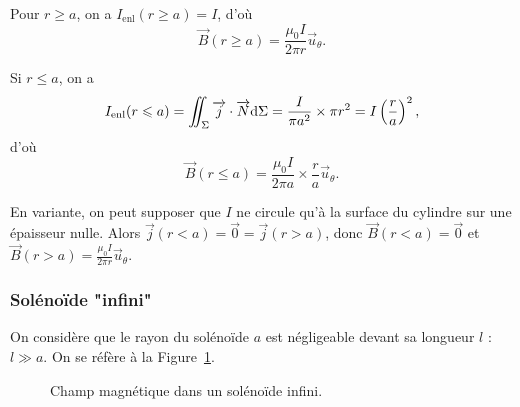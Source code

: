             Pour $r\geqslant a$, on a $I_{\text{enl}}(r\geqslant a)=I$, d'où 
            \begin{equation*}
                \boxed{
                    \vec{B}(r\geqslant a)=\frac{\mu_0 I}{2\pi r}\vec{u}_{\theta}.
                }
            \end{equation*}

            Si $r\leqslant a$, on a 
            \begin{equation*}
                I_{\text{enl}}(r\leqslant a)=\iint_{\Sigma}\protect\overrightarrow{{j}}\cdot\protect\overrightarrow{{N}}\mathrm{d}\Sigma=\frac{I}{\pi a^{2}}\times\pi r^{2}=I\left(\frac{r}{a}\right)^{2},
            \end{equation*}
            d'où
            \begin{equation*}
                \boxed{
                \vec{B}(r\leqslant a)=\frac{\mu_0 I}{2\pi a}\times\frac{r}{a}\vec{u}_{\theta}.}
            \end{equation*}

            En variante, on peut supposer que $I$ ne circule qu'à la surface du cylindre sur une épaisseur nulle. Alors $\vec{j}(r<a)=\vec{0}=\vec{j}(r>a)$, donc $\vec{B}(r<a)=\vec{0}$ et $\vec{B}(r>a)=\frac{\mu_0 I}{2\pi r}\vec{u}_{\theta}$.

        \subsubsection{Solénoïde "infini"}

            On considère que le rayon du solénoïde $a$ est négligeable devant sa longueur $l$ : $l\gg a$. On se réfère à la Figure~\ref{fig:solenoide_infini_champ_B}.

            \begin{figure}
                \centering
                \caption{Champ magnétique dans un solénoïde infini.}    
                \label{fig:solenoide_infini_champ_B}
            \end{figure}

